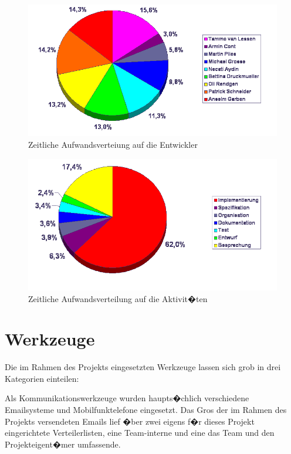 \documentclass[a4paper,titlepage,12pt,ngerman]{scrbook}
\begin{document}
\begin{figure}[h!]
  \centering
  \includegraphics[width=12.5cm]{praesentation/zeit_pro_entwickler}
  \caption{Zeitliche Aufwandsverteiung auf die Entwickler}
\end{figure}

\begin{figure}[h!]
  \centering
  \includegraphics[width=12.5cm]{praesentation/aufwand_pro_phase}
  \caption{Zeitliche Aufwandsverteilung auf die Aktivit�ten}
\end{figure}


\section{Werkzeuge}

Die im Rahmen des Projekts eingesetzten Werkzeuge lassen sich grob in drei Kategorien
einteilen:\par

Als Kommunikationswerkzeuge wurden haupts�chlich verschiedene Emailsysteme und 
Mobilfunktelefone eingesetzt. Das Gros der im Rahmen des Projekts versendeten
Emails lief �ber zwei eigens f�r dieses Projekt eingerichtete Verteilerlisten,
eine Team-interne und eine das Team und den Projekteigent�mer umfassende.\par
\end{document}

